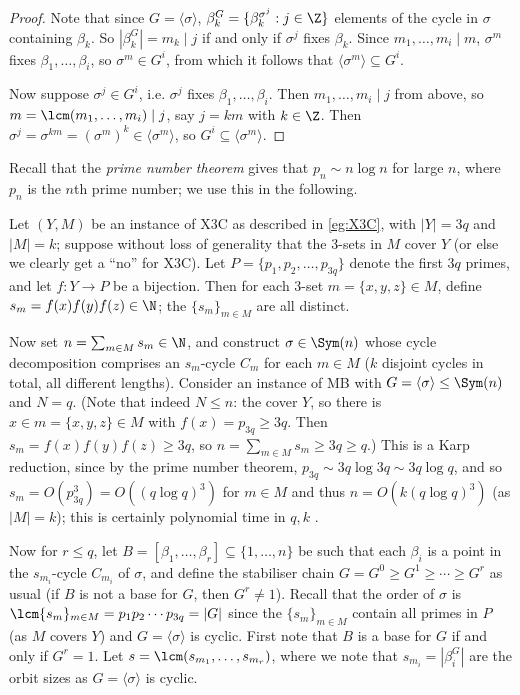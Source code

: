 \begin{proof}
    Note that since $G = \langle \sigma \rangle$,  $\beta_k^G = \{\beta_k^{\sigma^j} : j \in \Z\}$  elements of the cycle in $\sigma$ containing $\beta_k$. So $|\beta_k^G| = m_k \mid j$ if and only if $\sigma^j$ fixes $\beta_k$. Since $m_1,\dotsc,m_i \mid m$,  $\sigma^m$ fixes $\beta_1,\dotsc,\beta_i$, so $\sigma^m \in G^i$, from which it follows that $\langle \sigma^m \rangle \subseteq G^i$.

    Now suppose $\sigma^j \in G^i$, i.e. $\sigma^j$ fixes $\beta_1,\dotsc,\beta_i$. Then $m_1,\dotsc,m_i \mid j$ from above, so $m = \lcm(m_1,\dotsc,m_i) \mid j$, say $j = km$ with $k \in \Z$. Then $\sigma^j = \sigma^{km} = (\sigma^m)^k \in \langle \sigma^m \rangle$, so $G^i \subseteq \langle \sigma^m \rangle$.
\end{proof}

Recall that the \textit{prime number theorem} gives that $p_n \sim n\log n$ for large $n$, where $p_n$ is the $n$th prime number; we use this in the following. 

Let $(Y,M)$ be an instance of X3C as described in \autoref{eg:X3C}, with $|Y| = 3q$ and $|M| = k$; suppose without loss of generality that the 3-sets in $M$ cover $Y$ (or else we clearly get a ``no'' for X3C). Let $P = \{p_1,p_2,\dotsc,p_{3q}\}$ denote the first $3q$ primes, and let $f : Y \to P$ be a bijection. Then for each 3-set $m = \{x,y,z\} \in M$, define $s_m = f(x)f(y)f(z) \in \N$; the $\{s_m\}_{m \in M}$ are all distinct.

Now set $n = \sum_{m \in M} s_m \in \N$, and construct $\sigma \in \Sym(n)$ whose cycle decomposition comprises an $s_m$-cycle $C_m$ for each $m \in M$ ($k$ disjoint cycles in total, all different lengths). Consider an instance of MB with $G = \langle \sigma \rangle \leq \Sym(n)$ and $N = q$. (Note that indeed $N \leq n$: the  cover $Y$, so there is $x \in m = \{x,y,z\} \in M$ with $f(x) = p_{3q} \geq 3q$. Then $s_m = f(x)f(y)f(z) \geq 3q$, so $n = \sum_{m \in M} s_m \geq 3q \geq q$.) This is a Karp reduction, since by the prime number theorem, $p_{3q} \sim 3q\log 3q \sim 3q\log q$, and so $s_m = O(p_{3q}^3) = O((q\log q)^3)$ for $m \in M$ and thus $n = O(k(q\log q)^3)$ (as $|M| = k$); this is certainly polynomial time in $q,k$ .

Now for $r \leq q$, let $B = [\beta_1,\dotsc,\beta_r] \subseteq \{1,\dotsc,n\}$ be such that each $\beta_i$ is a point in the $s_{m_i}$-cycle $C_{m_i}$ of $\sigma$, and define the stabiliser chain $G = G^0 \geq G^1 \geq \dotsb \geq G^r$ as usual (if $B$ is not a base for $G$, then $G^r \neq 1$). Recall that the order of $\sigma$ is $\lcm\{s_m\}_{m \in M} = p_1 p_2 \dotsb p_{3q} = |G|$ since the $\{s_m\}_{m \in M}$ contain all primes in $P$ (as $M$ covers $Y$) and $G = \langle \sigma \rangle$ is cyclic. First note that $B$ is a base for $G$ if and only if $G^r = 1$. Let $s = \lcm(s_{m_1},\dotsc,s_{m_r})$, where we note that $s_{m_i} = |\beta_i^G|$ are the orbit sizes as $G = \langle \sigma \rangle$ is cyclic. 


